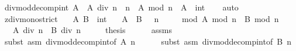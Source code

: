 \begin{isabellebody}
\isanewline
{}\isamarkupfalse%
\ div{\isacharunderscore}{\kern0pt}mod{\isacharunderscore}{\kern0pt}decomp{\isacharunderscore}{\kern0pt}int{\isacharcolon}{\kern0pt}\ {\isachardoublequoteopen}A\ {\isacharequal}{\kern0pt}\ {\isacharparenleft}{\kern0pt}A\ div\ n{\isacharparenright}{\kern0pt}\ {\isacharasterisk}{\kern0pt}\ n\ {\isacharplus}{\kern0pt}\ {\isacharparenleft}{\kern0pt}A\ mod\ n{\isacharparenright}{\kern0pt}{\isachardoublequoteclose}\ \ A\ {\isacharcolon}{\kern0pt}{\isacharcolon}{\kern0pt}\ int\isanewline
%
\isadelimproof
\ \ %
\endisadelimproof
%
\isatagproof
{}\isamarkupfalse%
\ auto%
\endisatagproof
{\isafoldproof}%
%
\isadelimproof
\isanewline
%
\endisadelimproof
\isanewline
{}\isamarkupfalse%
\ zdiv{\isacharunderscore}{\kern0pt}mono{\isacharunderscore}{\kern0pt}strict{\isacharcolon}{\kern0pt}\isanewline
\ \ \ A\ B\ {\isacharcolon}{\kern0pt}{\isacharcolon}{\kern0pt}\ int\isanewline
\ \ \ {\isachardoublequoteopen}A\ {\isacharless}{\kern0pt}\ B{\isachardoublequoteclose}\ {\isachardoublequoteopen}{}\ {\isacharless}{\kern0pt}\ n{\isachardoublequoteclose}\ \isanewline
\ \ \ \ mod{\isacharcolon}{\kern0pt}\ {\isachardoublequoteopen}A\ mod\ n\ {\isacharequal}{\kern0pt}\ {}{\isachardoublequoteclose}{\isachardoublequoteopen}B\ mod\ n\ {\isacharequal}{\kern0pt}\ {}{\isachardoublequoteclose}\isanewline
\ \ \ {\isachardoublequoteopen}{\isacharparenleft}{\kern0pt}A\ div\ n{\isacharparenright}{\kern0pt}\ {\isacharless}{\kern0pt}\ {\isacharparenleft}{\kern0pt}B\ div\ n{\isacharparenright}{\kern0pt}{\isachardoublequoteclose}\isanewline
%
\isadelimproof
%
\endisadelimproof
%
\isatagproof
{}\isamarkupfalse%
\ {\isacharminus}{\kern0pt}\isanewline
\ \ \isamarkupfalse%
\ {\isacharquery}{\kern0pt}thesis\isanewline
\ \ \ \ \isamarkupfalse%
\ assms{\isacharparenleft}{\kern0pt}{}{\isacharparenright}{\kern0pt}\isanewline
\ \ \ \ \isamarkupfalse%
\ {\isacharparenleft}{\kern0pt}subst\ {\isacharparenleft}{\kern0pt}asm{\isacharparenright}{\kern0pt}\ div{\isacharunderscore}{\kern0pt}mod{\isacharunderscore}{\kern0pt}decomp{\isacharunderscore}{\kern0pt}int{\isacharbrackleft}{\kern0pt}of\ A\ n{\isacharbrackright}{\kern0pt}{\isacharparenright}{\kern0pt}\isanewline
\ \ \ \ \isamarkupfalse%
\ {\isacharparenleft}{\kern0pt}subst\ {\isacharparenleft}{\kern0pt}asm{\isacharparenright}{\kern0pt}\ div{\isacharunderscore}{\kern0pt}mod{\isacharunderscore}{\kern0pt}decomp{\isacharunderscore}{\kern0pt}int{\isacharbrackleft}{\kern0pt}of\ B\ n{\isacharbrackright}{\kern0pt}{\isacharparenright}{\kern0pt}\isanewline

\end{isabellebody}
